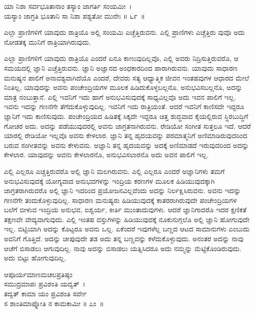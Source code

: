 \begin{shloka}
ಯಾ ನಿಶಾ ಸರ್ವಭೂತಾನಾಂ ತಸ್ಯಾಂ ಜಾಗರ್ತಿ ಸಂಯಮೀ~।\\ಯಸ್ಯಾಂ ಜಾಗ್ರತಿ ಭೂತಾನಿ ಸಾ ನಿಶಾ ಪಶ್ಯತೋ ಮುನೇಃ \hfill॥ ೬೯~॥
\end{shloka}

\begin{artha}
ಎಲ್ಲಾ ಪ್ರಾಣಿಗಳಿಗೆ ಯಾವುದು ರಾತ್ರಿಯೊ ಅಲ್ಲಿ ಸಂಯಮಿ ಎಚ್ಚೆತ್ತಿರುವನು. ಎಲ್ಲಿ ಪ್ರಾಣಿಗಳು ಎಚ್ಚೆತ್ತಿರು ವುವೊ ಅದು ನೋಡತಕ್ಕ ಮುನಿಗೆ ರಾತ್ರಿಯಾಗಿರುವುದು.
\end{artha}

ಎಲ್ಲಾ ಪ್ರಾಣಿಗಳಿಗೆ ಯಾವುದು ರಾತ್ರಿಯೊ ಎಂದರೆ ಏನೂ ಕಾಣುವುದಿಲ್ಲವೊ, ಎಲ್ಲಿ ಅವರು ನಿದ್ರಿಸುತ್ತಿರುವರೊ, ಆ ಸಮಯದಲ್ಲಿ ಜ್ಞಾನಿ ಎಚ್ಚೆತ್ತಿರುವನು. ಜ್ಞಾನಿ ಅಜ್ಞಾನದ ಅಂಧಕಾರದಿಂದ ಪಾರಾಗಿರುವನು. ಯಾವುದು ಸಾಧಾರಣ ಮನುಷ್ಯನ ಪಾಲಿಗೆ ಅನಾವಶ್ಯವಾಗಿದೆಯೊ ಎಂದರೆ, ದೇವರು ಸತ್ಯ ಆಧ್ಯಾತ್ಮಿಕ ಜೀವನ ಇಂತಹವುಗಳ ಆಧಾರದ ಮೇಲೆ ನಿಂತಿಲ್ಲ, ಯಾವುದನ್ನು ಅವನು ಪಂಚೇಂದ್ರಿಯಗಳ ಮೂಲಕ ಹಿಡಿದುಕೊಳ್ಳಬಲ್ಲನೊ, ಅನುಭವಿಸಬಲ್ಲನೊ, ಅದನ್ನು ಮಾತ್ರ ನಂಬುತ್ತಾನೆ. ಎಲ್ಲಿ ಇವನಿಗೆ ಇದು ಹಾಗೆ ಅನುಭವಿಸುವುದಕ್ಕೆ ಸಾಧ್ಯವಿಲ್ಲವೊ ಅದು ಇವನ ಪಾಲಿಗೆ ಇಲ್ಲ. ಇವನು ಇದನ್ನು ಗಣನೆಗೇ ತೆಗೆದುಕೊಳ್ಳುವುದಿಲ್ಲ. ಇವನಿಗೆ ಇದು ರಾತ್ರಿಯಂತೆ. ಆದರೆ ಇವನಿಗೆ ಕಾಣಿಸದೇ ಇದ್ದರೂ ಜ್ಞಾನಿಗೆ ಇದು ಕಾಣಿಸುವುದು. ಪಂಚೇಂದ್ರಿಯದ ಹಿಡಿತಕ್ಕೆ ಸಿಕ್ಕದೇ ಇದ್ದರೂ ಚಿತ್ತ ಶುದ್ಧವಾದ ಕೈಯಲ್ಲಿರುವ ಸ್ಥಿರಬುದ್ಧಿಗೆ ಗೋಚರ ಅದು. ಅದನ್ನು ಪಡೆಯುವುದರಲ್ಲಿ ಅವನು ಜಾಗ್ರತನಾಗಿರುವನು. ರೇಡಿಯೋ ಸಂಗೀತ ಸುತ್ತಲೂ ಇದೆ. ಆದರೆ ಯಾರಲ್ಲಿ ರೇಡಿಯೋ ಇಲ್ಲವೊ ಅವನು ಕೇಳಲಾರ. ಜ್ಞಾನಿ ತನ್ನ ಹೃದಯವನ್ನು ಪರಮಾತ್ಮನಿಗೆ ಅಣಿಮಾಡಿರುವುದರಿಂದ ಬರುವ ಸಂಗೀತವನ್ನು ಅವನು ಕೇಳುವನು. ಅಜ್ಞಾನಿ ತನ್ನ ಹೃದಯವನ್ನು ಅದಕ್ಕೆ ಅಣಿಮಾಡದೆ ಇರುವುದರಿಂದ ಅದನ್ನು ಕೇಳಲಾರ. ಯಾವುದನ್ನು ಅವನು ಕೇಳಲಾರನೊ, ಅನುಭವಿಸಲಾರನೊ ಅದು ಅವನ ಪಾಲಿಗೆ ಇಲ್ಲ.

ಎಲ್ಲಿ ಎಲ್ಲರೂ ಎಚ್ಚತ್ತಿರುವರೊ ಅಲ್ಲಿ ಜ್ಞಾನಿ ಮಲಗಿರುವನು. ಎಲ್ಲಿ ಎಲ್ಲರೂ ಎಂದರೆ ಅಜ್ಞಾನಿಗಳು ತಮಗೆ ಅನುಭವಿಸುವುದಕ್ಕೆ ಯೋಗ್ಯವಾದ ಅನುಭವಗಳನ್ನು ಇಂದ್ರಿಯ ಕರಣಗಳ ಮೂಲಕ ಹಿಡಿಯುವುದಕ್ಕಾಗಿ ಜಾಗ್ರತರಾಗಿರುವರೊ ಅಲ್ಲಿ ಜ್ಞಾನಿ ಇದರಿಂದ ಪ್ರಯೋಜನವಿಲ್ಲವೆಂದು ಅದನ್ನು ನಿರ್ಲಕ್ಷಿಸಿರುವನು. ಅವನು ಇದನ್ನು ಗಣನೆಗೇ ತಂದುಕೊಳ್ಳುವುದಿಲ್ಲ. ಸಾಧಾರಣ ಮನುಷ್ಯರು ಹಿಡಿಯುವುದಕ್ಕೆ ಕಾತರರಾಗಿರುವುದೇ ಪಂಚೇಂದ್ರಿಯಗಳ ಬಲೆಗೆ ಬೀಳುವ ಇಂದ್ರಿಯ ಅನುಭವ, ಐಶ್ವರ್ಯ, ಕೀರ್ತಿ ಮುಂತಾದುವುಗಳು. ಆದರೆ ಜ್ಞಾನಿಗಾದರೊ ಇದರ ಕ್ಷಣಿಕತೆ ತಕ್ಷಣವೇ ವೇದ್ಯವಾಗುವುದು. ಎಲ್ಲಿ ಇಂತಹ ವಸ್ತುಗಳನ್ನು ಹಿಡಿಯುವುದಕ್ಕೆ ನೂಕುನುಗ್ಗಲೊ ಅಲ್ಲಿ ಜ್ಞಾನಿ ಹೋಗುವುದೇ ಇಲ್ಲ. ಬಿಟ್ಟಿಯಾಗಿ ಅದನ್ನು ಕೊಟ್ಟರೂ ಅವನು ಒಲ್ಲ. ಏಕೆಂದರೆ ಇವುಗಳೆಲ್ಲ ಬಣ್ಣದ ಆಟದ ಸಾಮಾನುಗಳು ಎಂಬುದು ಅವನಿಗೆ ಗೊತ್ತಿದೆ. ಅದನ್ನು ಚೀಪುವುದೇ ತಡ ಅದು ತನ್ನ ಬಣ್ಣವನ್ನು ಕಳೆದುಕೊಳ್ಳುವುದು. ಅನಂತರ ಅದನ್ನು ನಾವು ಆಚೆಗೆ ಬಿಸಾಡಲು ಆಗುವುದಿಲ್ಲ. ನಾವು ಅದನ್ನು ಬಿಸಾಡಲು ಯತ್ನಿಸಿದರೂ ಅದು ನಮ್ಮನ್ನು ಮೆಟ್ಟಿಕೊಂಡಿರುವುದು. ಅದು ಬಿಟ್ಟು ಹೋಗುವುದಿಲ್ಲ.

\begin{shloka}
ಆಪೂರ್ಯಮಾಣಮಚಲಪ್ರತಿಷ್ಠಂ\\ಸಮುದ್ರಮಾಪಃ ಪ್ರವಿಶಂತಿ ಯದ್ವತ್~।\\ತದ್ವತ್ ಕಾಮಾ ಯಂ ಪ್ರವಿಶಂತಿ ಸರ್ವೇ\\ಸ ಶಾಂತಿಮಾಪ್ನೋತಿ ನ ಕಾಮಕಾಮೀ \hfill॥ ೭ಂ~॥
\end{shloka}

